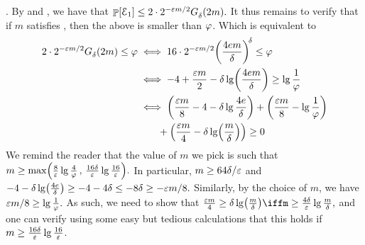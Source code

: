 \begin{proofof} {\textsc{.}}
    By  and , we have that
    \begin{math}
        \Prob{\Event_1} \leq%
        2 \cdot 2^{-\eps m /2} \fGrowX{2m}.
    \end{math}
    It thus remains to verify that if $m$ satisfies ,
    then the above is smaller than $\varphi$.
    Which is equivalent to
    \begin{align*}
      2 \cdot 2^{-\eps m/2} \fGrowX{2m} \leq \BadProb
      &  \iff
        16 \cdot 2^{-\eps m/2} \pth{\frac{4 e m}{\Dim}}^{\!\Dim}
        \leq \BadProb
      \\&
      \iff
        -4 + \frac{\eps m }{ 2} - \Dim \lg \pth{\frac{4 e m}{\Dim}}
        \geq \lg \frac{1}{\BadProb}%
      \\%
      &%
        \iff
        \pth{ \frac{ \eps m}{8} -4 - \Dim \lg \frac{4 e}{\Dim}}
        + \pth{ \frac{\eps m}{8} - \lg \frac{1}{\BadProb}}
        \\&\qquad
        + \pth{\frac{\eps m }{ 4} - \Dim \lg \pth{\frac{ m}{\Dim}}}
        \geq 0%
    \end{align*}
    We remind the reader that the value of $m$ we pick is such that 
    \begin{math}
        m \geq \max\pth{ \frac{8}{\eps} \lg \frac{4}{\BadProb} \,,\,
           \frac{16\Dim}{\eps}\lg \frac{16}{\eps} }.
    \end{math}
    In particular, $m \geq 64 \delta / {\varepsilon}$
    and
    \begin{math}
        -4 - \Dim \lg \pth{\frac{4 e }{\Dim}} \geq -4 - 4 \Dim \leq -8
        \Dim \geq -\eps m /8.
    \end{math} 
    Similarly, by the choice of $m$, we have
    \begin{math}
        {\varepsilon} m /8 \geq \lg \frac{1}{\varphi}. 
    \end{math}
    As such, we need to show that
    \begin{math}
        \frac{\eps m }{ 4} \geq \Dim \lg \pth{\frac{ m}{\Dim}} \iff%
        m \geq \frac{4\Dim}{\eps} \lg {\frac{ m}{\Dim}},
    \end{math}
    and one can verify using some easy but tedious calculations that
    this holds if $ m \geq \frac{16\delta}{{\varepsilon}}\lg \frac{16}{{\varepsilon}} $.
%    
\end{proofof}







